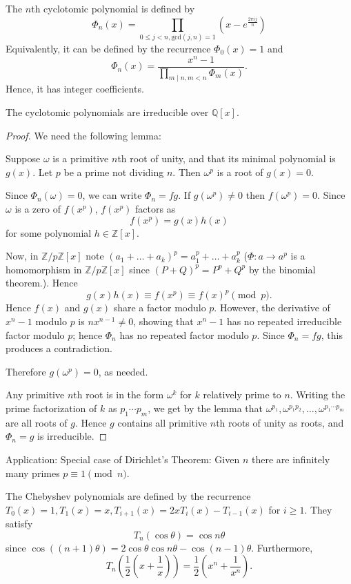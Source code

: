 The $n$th cyclotomic polynomial is defined by
\[ \Phi_n(x)=\prod_{0\leq j <n,\text{gcd}(j,n)=1}(x-e^{\frac{2\pi ij}{n}})\]
Equivalently, it can be defined by the recurrence $\Phi_0(x)=1$ and
\[ \Phi_n(x)=\frac{x^n-1}{\prod_{m\mid n,m<n}\Phi_m(x)}.\]
Hence, it has integer coefficients.
\begin{thm}
The cyclotomic polynomials are irreducible over $\mathbb{Q}[x]$.
\end{thm}
\begin{proof}
We need the following lemma:

Suppose $\omega$ is a primitive $n$th root of unity, and that its minimal polynomial is $g(x)$. Let $p$ be a prime not dividing $n$. Then $\omega^p$ is a root of $g(x)=0$.

Since $\Phi_n(\omega)=0$, we can write $\Phi_n=fg$. If $g(\omega^p)\neq 0$ then $f(\omega^p)=0$. Since $\omega$ is a zero of $f(x^p)$, $f(x^p)$ factors as
\[f(x^p)=g(x)h(x)\]
for some polynomial $h\in \mathbb{Z}[x]$.

Now, in $\mathbb{Z}/p\mathbb{Z}[x]$ note $(a_1+\ldots+a_k)^p=a_1^p+\ldots +a_k^p$ ($\Phi:a\to a^p$ is a homomorphism in $\mathbb{Z}/p\mathbb{Z}[x]$ since $(P+Q)^p=P^p+Q^p$ by the binomial theorem.).
Hence
\[g(x)h(x)\equiv f(x^p)\equiv f(x)^p \pmod{p}.\]
Hence $f(x)$ and $g(x)$ share a factor modulo $p$.
However, the derivative of $x^n-1$ modulo $p$ is $nx^{n-1}\neq 0$, showing that $x^n-1$ has no repeated irreducible factor modulo $p$; hence $\Phi_n$ has no repeated factor modulo $p$. Since $\Phi_n=fg$, this produces a contradiction.

Therefore $g(\omega^p)=0$, as needed.

Any primitive $n$th root is in the form $\omega^{k}$ for $k$ relatively prime to $n$. Writing the prime factorization of $k$ as $p_1\cdots p_m$, we get by the lemma that $\omega^{p_1},\omega^{p_1p_2},\ldots, \omega^{p_1\cdots p_m}$ are all roots of $g$. Hence $g$ contains all primitive $n$th roots of unity as roots, and $\Phi_n=g$ is irreducible.
\end{proof}
Application: Special case of Dirichlet's Theorem: Given $n$ there are infinitely many primes $p\equiv 1\pmod{n}$.

The Chebyshev polynomials are defined by the recurrence $T_0(x)=1, T_1(x)=x, T_{i+1}(x)=2xT_i(x)-T_{i-1}(x)$ for $i\geq 1$. They satisfy
\[T_n(\cos\theta)=\cos n\theta\]
since $\cos((n+1)\theta)=2\cos\theta \cos n\theta-\cos(n-1)\theta$.
Furthermore,
\[T_n\left(\frac{1}{2}\left(x+\frac{1}{x}\right)\right)=\frac{1}{2}\left(x^n+\frac{1}{x^n}\right).\]

